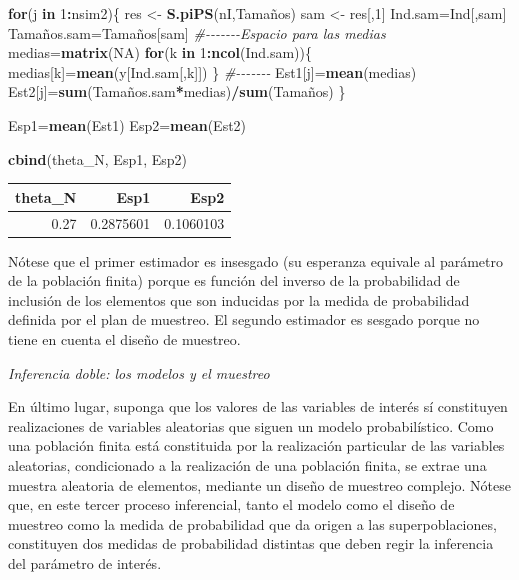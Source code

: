 \documentclass[
  12pt,
]{book}
\newenvironment{Shaded}{\begin{snugshade}}{\end{snugshade}}
\newcommand{\CommentTok}[1]{\textcolor[rgb]{0.56,0.35,0.01}{\textit{#1}}}
\newcommand{\ConstantTok}[1]{\textcolor[rgb]{0.56,0.35,0.01}{#1}}
\newcommand{\ControlFlowTok}[1]{\textcolor[rgb]{0.13,0.29,0.53}{\textbf{#1}}}
\newcommand{\DecValTok}[1]{\textcolor[rgb]{0.00,0.00,0.81}{#1}}
\newcommand{\FunctionTok}[1]{\textcolor[rgb]{0.13,0.29,0.53}{\textbf{#1}}}
\newcommand{\NormalTok}[1]{#1}
\newcommand{\OtherTok}[1]{\textcolor[rgb]{0.56,0.35,0.01}{#1}}
\newcommand{\SpecialCharTok}[1]{\textcolor[rgb]{0.81,0.36,0.00}{\textbf{#1}}}
\begin{document}
\begin{Shaded}
\begin{Highlighting}[]
\ControlFlowTok{for}\NormalTok{(j }\ControlFlowTok{in} \DecValTok{1}\SpecialCharTok{:}\NormalTok{nsim2)\{}
\NormalTok{res }\OtherTok{\textless{}{-}} \FunctionTok{S.piPS}\NormalTok{(nI,Tamaños)}
\NormalTok{sam }\OtherTok{\textless{}{-}}\NormalTok{ res[,}\DecValTok{1}\NormalTok{] }
\NormalTok{Ind.sam}\OtherTok{=}\NormalTok{Ind[,sam]}
\NormalTok{Tamaños.sam}\OtherTok{=}\NormalTok{Tamaños[sam]}
\CommentTok{\#{-}{-}{-}{-}{-}{-}{-}Espacio para las medias}
\NormalTok{medias}\OtherTok{=}\FunctionTok{matrix}\NormalTok{(}\ConstantTok{NA}\NormalTok{)}
\ControlFlowTok{for}\NormalTok{(k }\ControlFlowTok{in} \DecValTok{1}\SpecialCharTok{:}\FunctionTok{ncol}\NormalTok{(Ind.sam))\{}
\NormalTok{medias[k]}\OtherTok{=}\FunctionTok{mean}\NormalTok{(y[Ind.sam[,k]])}
\NormalTok{\}}
\CommentTok{\#{-}{-}{-}{-}{-}{-}{-}}
\NormalTok{Est1[j]}\OtherTok{=}\FunctionTok{mean}\NormalTok{(medias)}
\NormalTok{Est2[j]}\OtherTok{=}\FunctionTok{sum}\NormalTok{(Tamaños.sam}\SpecialCharTok{*}\NormalTok{medias)}\SpecialCharTok{/}\FunctionTok{sum}\NormalTok{(Tamaños)}
\NormalTok{\}}

\NormalTok{Esp1}\OtherTok{=}\FunctionTok{mean}\NormalTok{(Est1)}
\NormalTok{Esp2}\OtherTok{=}\FunctionTok{mean}\NormalTok{(Est2)}

\FunctionTok{cbind}\NormalTok{(theta\_N, Esp1, Esp2)}
\end{Highlighting}
\end{Shaded}

\begin{tabular}{r|r|r}
\hline
theta\_N & Esp1 & Esp2\\
\hline
0.27 & 0.2875601 & 0.1060103\\
\hline
\end{tabular}

Nótese que el primer estimador es insesgado (su esperanza equivale al parámetro de la población finita) porque es función del inverso de la probabilidad de inclusión de los elementos que son inducidas por la medida de probabilidad definida por el plan de muestreo. El segundo estimador es sesgado porque no tiene en cuenta el diseño de muestreo.

\emph{Inferencia doble: los modelos y el muestreo}

En último lugar, suponga que los valores de las variables de interés sí constituyen realizaciones de variables aleatorias que siguen un modelo probabilístico. Como una población finita está constituida por la realización particular de las variables aleatorias, condicionado a la realización de una población finita, se extrae una muestra aleatoria de elementos, mediante un diseño de muestreo complejo. Nótese que, en este tercer proceso inferencial, tanto el modelo como el diseño de muestreo como la medida de probabilidad que da origen a las superpoblaciones, constituyen dos medidas de probabilidad distintas que deben regir la inferencia del parámetro de interés.
\end{document}

